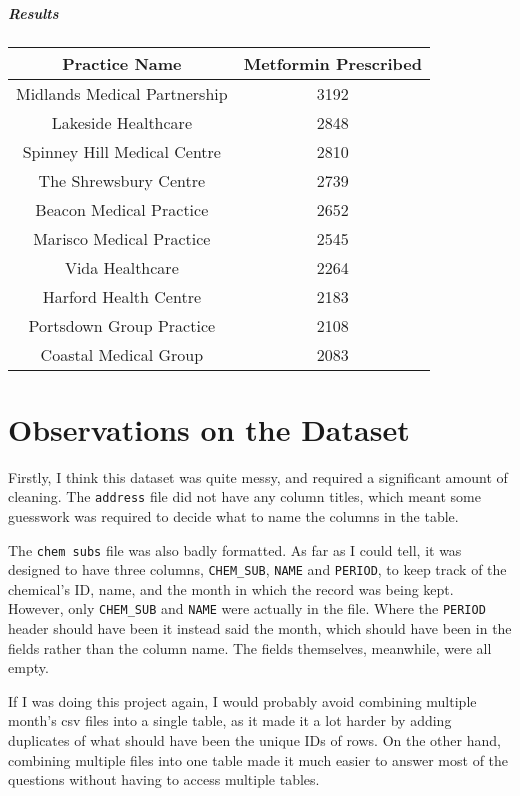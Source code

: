 \documentclass{report}
\begin{document}
\paragraph{Results}
\begin{center}
\begin{tabular}{ | c | c | }
\hline
Practice Name & Metformin Prescribed \\
\hline
Midlands Medical Partnership & 3192 \\
\hline
Lakeside Healthcare & 2848 \\
\hline
Spinney Hill Medical Centre & 2810 \\
\hline
The Shrewsbury Centre & 2739 \\
\hline
Beacon Medical Practice & 2652 \\
\hline
Marisco Medical Practice & 2545 \\
\hline
Vida Healthcare & 2264 \\
\hline
Harford Health Centre & 2183 \\
\hline
Portsdown Group Practice & 2108 \\
\hline
Coastal Medical Group & 2083 \\
\hline
\end{tabular}
\end{center}

\chapter{Observations on the Dataset}
Firstly, I think this dataset was quite messy, and required a significant amount of cleaning. The \texttt{address} file did not have any column titles, which meant some guesswork was required to decide what to name the columns in the table.

The \texttt{chem subs} file was also badly formatted. As far as I could tell, it was designed to have three columns, \texttt{CHEM\_SUB}, \texttt{NAME} and \texttt{PERIOD}, to keep track of the chemical's ID, name, and the month in which the record was being kept. However, only \texttt{CHEM\_SUB} and \texttt{NAME} were actually in the file. Where the \texttt{PERIOD} header should have been it instead said the month, which should have been in the fields rather than the column name. The fields themselves, meanwhile, were all empty.

If I was doing this project again, I would probably avoid combining multiple month's csv files into a single table, as it made it a lot harder by adding duplicates of what should have been the unique IDs of rows. On the other hand, combining multiple files into one table made it much easier to answer most of the questions without having to access multiple tables. 
\end{document}
